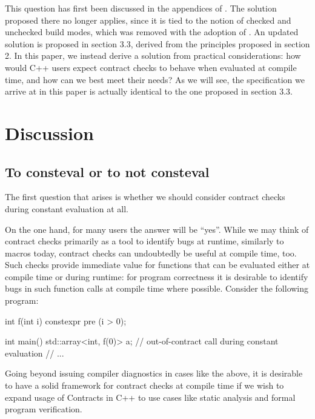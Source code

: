 This question has first been discussed in the appendices of \cite{P2834R1}. The solution proposed there no longer applies, since it is tied to the notion of checked and unchecked build modes, which was removed with the adoption of \cite{P2877R0}. An updated solution is proposed in \cite{P2932R1} section 3.3, derived from the  principles proposed in \cite{P2932R1} section 2. In this paper, we instead derive a solution from practical considerations: how would C++ users expect contract checks to behave when evaluated at compile time, and how can we best meet their needs? As we will see, the specification we arrive at in this paper is actually identical to the one proposed in \cite{P2932R1} section 3.3.


\section{Discussion}

\subsection{To consteval or to not consteval}

The first question that arises is whether we should consider contract checks during constant evaluation at all.

On the one hand, for many users the answer will be ``yes''. While we may think of contract checks primarily as a tool to identify bugs at runtime, similarly to  macros today, contract checks can undoubtedly be useful at compile time, too. Such checks provide immediate value for  functions that can be evaluated either at compile time or during runtime: for program correctness it is desirable to identify bugs in such function calls at compile time where possible. Consider the following program:

\begin{codeblock}
int f(int i) constexpr 
  pre (i > 0);

int main() {
  std::array<int, f(0)> a;  // out-of-contract call during constant evaluation
  // ...
}
\end{codeblock}

Going beyond issuing compiler diagnostics in cases like the above, it is desirable to have a solid framework for contract checks at compile time if we wish to expand usage of Contracts in C++ to use cases like static analysis and formal program verification. 

